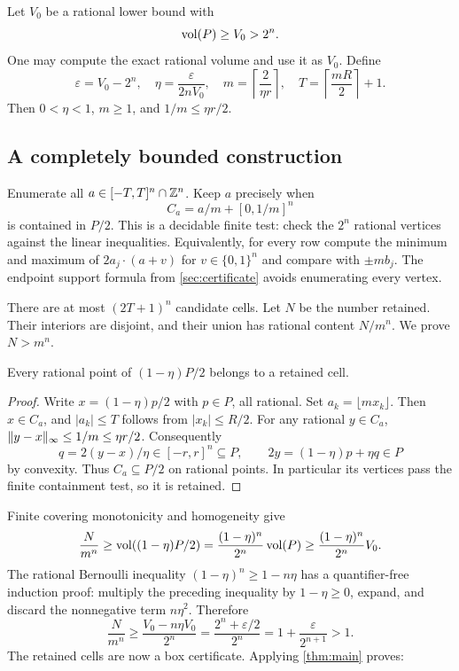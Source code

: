 Let \(V_0\) be a rational lower bound with
\[
                           \operatorname{vol}(P)\geq V_0>2^n.
\]
One may compute the exact rational volume and use it as
\(V_0\). Define
\begin{equation}\label{eq:mesh-bound}
 \varepsilon=V_0-2^n,\quad
 \eta=\frac{\varepsilon}{2nV_0},\quad
 m=\left\lceil\frac{2}{\eta r}\right\rceil,\quad
 T=\left\lceil\frac{mR}{2}\right\rceil+1.
\end{equation}
Then \(0<\eta<1\), \(m\geq1\), and
\(1/m\leq\eta r/2\).

\subsection{A completely bounded construction}

Enumerate all \(a\in[-T,T]^n\cap\mathbb Z^n\).
Keep \(a\) precisely when
\[
                          C_a=a/m+[0,1/m]^n
\]
is contained in \(P/2\). This is a decidable finite test:
check the \(2^n\) rational vertices against the linear
inequalities. Equivalently, for every row compute
the minimum and maximum of \(2a_j\cdot(a+v)\) for
\(v\in\{0,1\}^n\) and compare with \(\pm mb_j\).
The endpoint support formula from
\cref{sec:certificate} avoids enumerating every vertex.

There are at most \((2T+1)^n\) candidate cells.
Let \(N\) be the number retained. Their interiors are
disjoint, and their union has rational content \(N/m^n\).
We prove \(N>m^n\).

\begin{lemma}\label{lem:shrink}
Every rational point of \((1-\eta)P/2\) belongs to a retained cell.
\end{lemma}

\begin{proof}
Write \(x=(1-\eta)p/2\) with \(p\in P\), all rational.
Set \(a_k=\lfloor mx_k\rfloor\). Then \(x\in C_a\),
and \(|a_k|\leq T\) follows from \(|x_k|\leq R/2\).
For any rational \(y\in C_a\),
\(\lVert y-x\rVert_\infty\leq1/m\leq\eta r/2\).
Consequently
\[
 q=2(y-x)/\eta\in[-r,r]^n\subseteq P,\qquad
 2y=(1-\eta)p+\eta q\in P
\]
by convexity. Thus \(C_a\subseteq P/2\) on rational
points. In particular its vertices pass the finite
containment test, so it is retained.
\end{proof}

Finite covering monotonicity and homogeneity give
\[
 \frac{N}{m^n}\geq\operatorname{vol}((1-\eta)P/2)
   =\frac{(1-\eta)^n}{2^n}\operatorname{vol}(P)
   \geq\frac{(1-\eta)^n}{2^n}V_0.
\]
The rational Bernoulli inequality
\((1-\eta)^n\geq1-n\eta\) has a quantifier-free induction
proof: multiply the preceding inequality by
\(1-\eta\geq0\), expand, and discard the nonnegative term
\(n\eta^2\). Therefore
\begin{equation}\label{eq:excess}
 \frac{N}{m^n}\geq
 \frac{V_0-n\eta V_0}{2^n}
 =\frac{2^n+\varepsilon/2}{2^n}
 =1+\frac{\varepsilon}{2^{n+1}}>1.
\end{equation}
The retained cells are now a box certificate. Applying
\cref{thm:main} proves:

